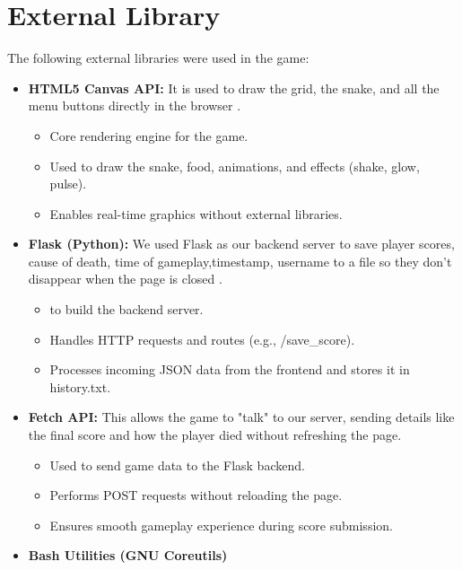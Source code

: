 \maketitle

\section{External Library}
The following external libraries were used in the game: 
\begin{itemize}
    \item \textbf{HTML5 Canvas API:} It is used to draw the grid, the snake, and all the menu buttons directly in the browser .
    \begin{itemize}
    \item Core rendering engine for the game.
    \item Used to draw the snake, food, animations, and effects (shake, glow, pulse).
    \item Enables real-time graphics without external libraries.
    \end{itemize}
    \item \textbf{Flask (Python):} We used Flask as our backend server to save player scores, cause of death, time of gameplay,timestamp, username to a file so they don't disappear when the page is closed .
    \begin{itemize}
    \item to build the backend server.
    \item Handles HTTP requests and routes (e.g., /save\_score).
    \item Processes incoming JSON data from the frontend and stores it in history.txt.
    \end{itemize}
    \item \textbf{Fetch API:} This allows the game to "talk" to our server, sending details like the final score and how the player died without refreshing the page.
    \begin{itemize}
        \item Used to send game data to the Flask backend.
        \item Performs POST requests without reloading the page.
        \item Ensures smooth gameplay experience during score submission.
    \end{itemize}
    \item \textbf{Bash Utilities (GNU Coreutils)}
\end{itemize}

